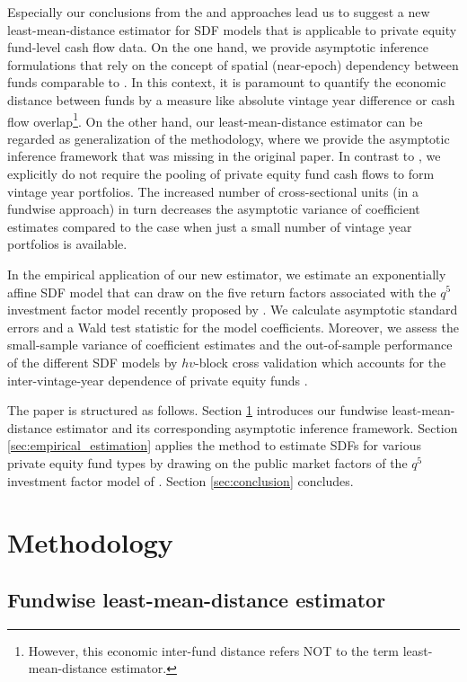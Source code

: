 \documentclass[12pt]{article}
\begin{document}
Especially our conclusions from the \cite{DLP12} and \cite{KN16} approaches lead us to suggest a new least-mean-distance estimator for SDF models that is applicable to private equity fund-level cash flow data.
On the one hand, we provide asymptotic inference formulations that rely on the concept of spatial (near-epoch) dependency between funds comparable to \cite{KN16}.
In this context, it is paramount to quantify the economic distance between funds by a measure like absolute vintage year difference or cash flow overlap\footnote{However, this economic inter-fund distance refers NOT to the term least-mean-distance estimator.}.
On the other hand, our least-mean-distance estimator can be regarded as generalization of the \cite{DLP12} methodology, where we provide the asymptotic inference framework that was missing in the original paper.
In contrast to \cite{DLP12}, we explicitly do not require the pooling of private equity fund cash flows to form vintage year portfolios.
The increased number of cross-sectional units (in a fundwise approach) in turn decreases the asymptotic variance of coefficient estimates compared to the case when just a small number of vintage year portfolios is available.

In the empirical application of our new estimator, we estimate an exponentially affine SDF model that can draw on the five return factors associated with the $q^5$ investment factor model recently proposed by \cite{HXZ20}.
We calculate asymptotic standard errors and a Wald test statistic for the model coefficients.
Moreover, we assess the small-sample variance of coefficient estimates and the out-of-sample performance of the different SDF models by $hv$-block cross validation which accounts for the inter-vintage-year dependence of private equity funds \citep{R00}.

The paper is structured as follows. 
Section \ref{sec:Methodology} introduces our fundwise least-mean-distance estimator and its corresponding asymptotic inference framework.
Section \ref{sec:empirical_estimation} applies the method to estimate SDFs for various private equity fund types by drawing on the public market factors of the $q^5$ investment factor model of \cite{HXZ20}.
Section \ref{sec:conclusion} concludes.


\section{Methodology}
\label{sec:Methodology}

\subsection{Fundwise least-mean-distance estimator}
\end{document}
